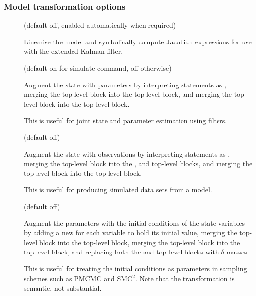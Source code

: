 \subsubsection{Model transformation options}
\begin{description}
\item[] (default off, enabled automatically when
  required)

Linearise the model and symbolically compute Jacobian expressions for use with
the extended Kalman filter.

\item[] (default on for simulate
  command, off otherwise)

Augment the state with parameters by interpreting  statements as
, merging the  top-level block into the
 top-level block, and merging the
 top-level block into the
 top-level block.

This is useful for joint state and parameter estimation using filters.

\item[] (default off)

Augment the state with observations by interpreting  statements as
, merging the  top-level block into the
,  and 
top-level blocks, and merging the  top-level
block into the  top-level block.

This is useful for producing simulated data sets from a model.

\item[] (default off)

Augment the parameters with the initial conditions of the state variables by
adding a new  for each  variable to hold its initial
value, merging the  top-level block into the
 top-level block, merging the 
top-level block into the  top-level block, and
replacing both the  and
 top-level blocks with $\delta$-masses.

This is useful for treating the initial conditions as parameters in sampling
schemes such as PMCMC and SMC$^2$. Note that the transformation is semantic,
not substantial.

\end{description}
